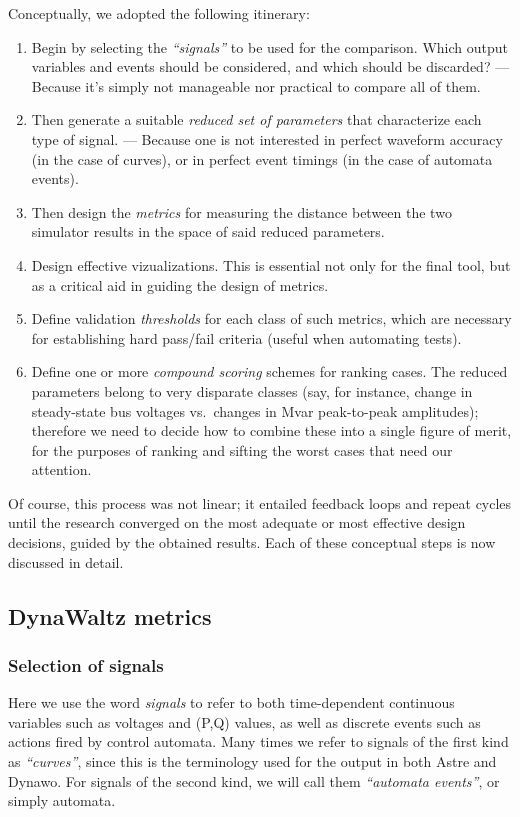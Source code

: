 \documentclass[conference]{IEEEtran}
\begin{document}
Conceptually, we adopted the following itinerary:
\begin{enumerate}
  \item Begin by selecting the \emph{``signals''} to be
    used for the comparison. Which output variables and events should
    be considered, and which should be discarded? --- Because it's simply
    not manageable nor practical to compare all of them.
  \item Then generate a suitable \emph{reduced set of parameters} that
    characterize each type of signal. ---  Because one is not interested
    in perfect waveform accuracy (in the case of curves), or in
    perfect event timings (in the case of automata events).
  \item Then design the \emph{metrics} for measuring the distance
    between the two simulator results in the space of said reduced
    parameters.
  \item Design effective vizualizations. This is essential not only
    for the final tool, but as a critical aid in guiding the design of
    metrics.
  \item Define validation \emph{thresholds} for each class of such
    metrics, which are necessary for establishing hard pass/fail
    criteria (useful when automating tests).
  \item Define one or more \emph{compound scoring} schemes for ranking
    cases. The reduced parameters belong to very disparate classes
    (say, for instance, change in steady-state bus voltages
    vs.\ changes in Mvar peak-to-peak amplitudes); therefore we need
    to decide how to combine these into a single figure of merit, for
    the purposes of ranking and sifting the worst cases that need our
    attention.
\end{enumerate}
Of course, this process was not linear; it entailed feedback loops and
repeat cycles until the research converged on the most adequate or
most effective design decisions, guided by the obtained results.  Each
of these conceptual steps is now discussed in detail.



\subsection{DynaWaltz metrics}

\subsubsection{Selection of signals}
Here we use the word \emph{signals} to refer to both time-dependent continuous
variables such as voltages and (P,Q) values, as well as discrete events such as
actions fired by control automata.  Many times we refer to signals of the
first kind as \emph{``curves''}, since this is the terminology used for the
output in both Astre and Dynawo. For signals of the second kind, we will
call them \emph{``automata events''}, or simply automata.
\end{document}
